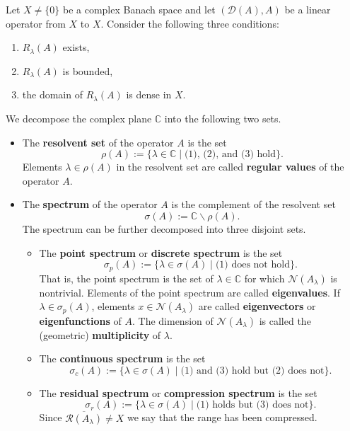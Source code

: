 \begin{Definition}
\label{def:resolvent-spectrum-and-spectral-parts}
Let $X\ne\{0\}$ be a complex Banach space and let $(\mathcal{D}(A),A)$ be a linear operator from $X$ to $X$. Consider the following three conditions:\begin{enumerate}\item $R_\lambda(A)$ exists,\item $R_\lambda(A)$ is bounded,\item the domain of $R_\lambda(A)$ is dense in $X$.\end{enumerate}We decompose the complex plane $\mathbb{C}$ into the following two sets.\begin{itemize}\item The \textbf{resolvent set} of the operator $A$ is the set
\begin{equation}\label{eq:resolvent-set-definition}
\rho(A):=\{\lambda\in\mathbb{C}\mid\text{(1), (2), and (3) hold}\}.
\end{equation}
Elements $\lambda\in\rho(A)$ in the resolvent set are called \textbf{regular values} of the operator $A$.\item The \textbf{spectrum} of the operator $A$ is the complement of the resolvent set
\begin{equation}\label{eq:operator-spectrum-definition}
\sigma(A):=\mathbb{C}\backslash\rho(A).
\end{equation}
The spectrum can be further decomposed into three disjoint sets.\begin{itemize}\item The \textbf{point spectrum} or \textbf{discrete spectrum} is the set
\begin{equation}\label{eq:operator-point-spectrum-definition}
\sigma_p(A):=\{\lambda\in\sigma(A)\mid\text{(1) does not hold}\}.
\end{equation}
That is, the point spectrum is the set of $\lambda\in\mathbb{C}$ for which $\mathcal{N}(A_\lambda)$ is nontrivial. Elements of the point spectrum are called \textbf{eigenvalues}. If $\lambda\in\sigma_p(A)$, elements $x\in\mathcal{N}(A_\lambda)$ are called \textbf{eigenvectors} or \textbf{eigenfunctions} of $A$. The dimension of $\mathcal{N}(A_\lambda)$ is called the (geometric) \textbf{multiplicity} of $\lambda$.\item The \textbf{continuous spectrum} is the set
\begin{equation}\label{eq:operator-continuous-spectrum-definition}
\sigma_c(A):=\{\lambda\in\sigma(A)\mid\text{(1) and (3) hold but (2) does not}\}.
\end{equation}
\item The \textbf{residual spectrum} or \textbf{compression spectrum} is the set
\begin{equation}\label{eq:operator-residual-spectrum-definition}
\sigma_r(A):=\{\lambda\in\sigma(A)\mid\text{(1) holds but (3) does not}\}.
\end{equation}
Since $\overline{\mathcal{R}(A_\lambda)}\ne X$ we say that the range has been compressed.\end{itemize}\end{itemize}
\end{Definition}

